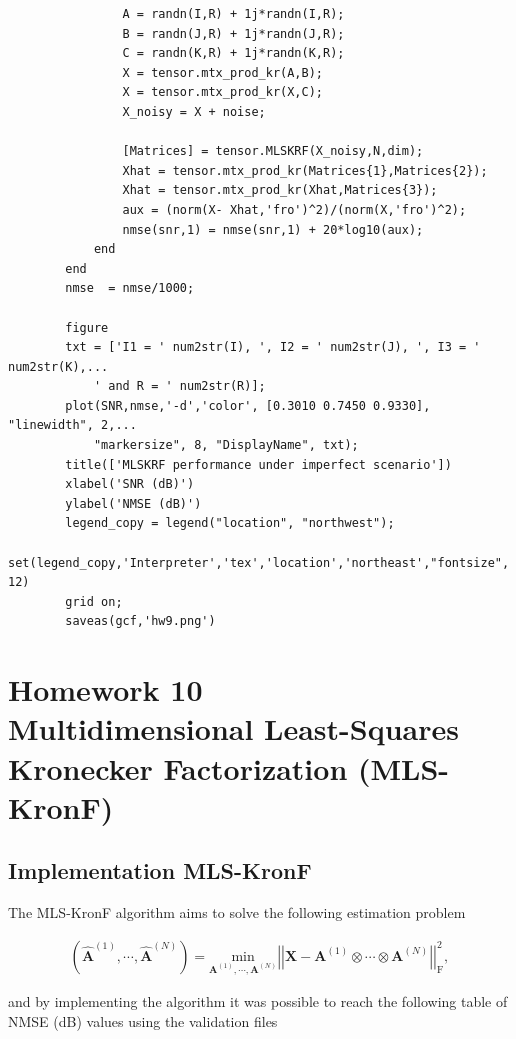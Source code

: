 \documentclass[a4paper,10pt]{article}
\begin{document}
\begin{verbatim}
                A = randn(I,R) + 1j*randn(I,R);
                B = randn(J,R) + 1j*randn(J,R);
                C = randn(K,R) + 1j*randn(K,R);
                X = tensor.mtx_prod_kr(A,B);
                X = tensor.mtx_prod_kr(X,C);
                X_noisy = X + noise;
                
                [Matrices] = tensor.MLSKRF(X_noisy,N,dim);
                Xhat = tensor.mtx_prod_kr(Matrices{1},Matrices{2});
                Xhat = tensor.mtx_prod_kr(Xhat,Matrices{3});
                aux = (norm(X- Xhat,'fro')^2)/(norm(X,'fro')^2);
                nmse(snr,1) = nmse(snr,1) + 20*log10(aux);
            end
        end
        nmse  = nmse/1000;

        figure
        txt = ['I1 = ' num2str(I), ', I2 = ' num2str(J), ', I3 = ' num2str(K),...
            ' and R = ' num2str(R)];
        plot(SNR,nmse,'-d','color', [0.3010 0.7450 0.9330], "linewidth", 2,...
            "markersize", 8, "DisplayName", txt);
        title(['MLSKRF performance under imperfect scenario'])
        xlabel('SNR (dB)')
        ylabel('NMSE (dB)')
        legend_copy = legend("location", "northwest");
        set(legend_copy,'Interpreter','tex','location','northeast',"fontsize", 12)
        grid on;
        saveas(gcf,'hw9.png')
    \end{verbatim}
    
\newpage
\section*{Homework 10 \\ Multidimensional Least-Squares Kronecker Factorization
(MLS-KronF)}

    \subsection*{Implementation MLS-KronF}

    The MLS-KronF algorithm aims to solve the following estimation problem 

    \begin{align}
        \left(\hat{\boldsymbol{A}}^{(1)}, \cdots, \hat{\boldsymbol{A}}^{(N)}\right) = \underset{\boldsymbol{A}^{(1)}, \cdots, \boldsymbol{A}^{(N)}}{\text{min}} \left|\left| \boldsymbol{X} - \boldsymbol{A}^{(1)} \otimes \cdots \otimes \boldsymbol{A}^{(N)} \right|\right|^2_{\text{F}},
    \end{align}

    and by implementing the algorithm it was possible to reach the following table of NMSE (dB) values using the validation files 
\end{document}
